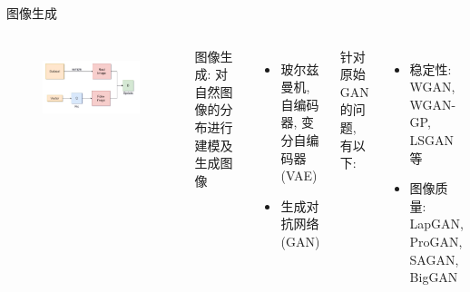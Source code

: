 \begin{frame}{图像生成}
    \begin{columns}
        \begin{figure}
            \centering
            \includegraphics[width=\textwidth]{pic/chap0104.jpg}
            \label{fig:0104}
        \end{figure}

        图像生成: 对自然图像的分布进行建模及生成图像
        \begin{itemize}
            \item 玻尔兹曼机, 自编码器, 变分自编码器(VAE)
            \item 生成对抗网络(GAN)
        \end{itemize}

        针对原始GAN的问题, 有以下:
        \begin{itemize}
            \item 稳定性: WGAN, WGAN-GP, LSGAN等
            \item 图像质量: LapGAN, ProGAN, SAGAN, BigGAN
        \end{itemize}
    \end{columns}

\end{frame}

